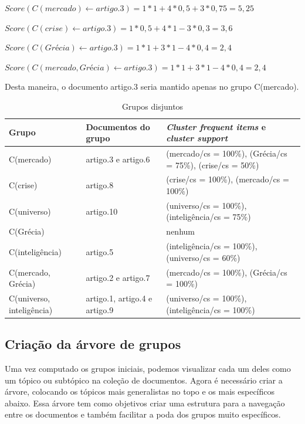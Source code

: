 \documentclass[a4paper,12pt]{article}
\begin{document}
\begin{flushleft}

$Score(C(mercado) \gets artigo.3) = 1 * 1 + 4 * 0,5 + 3 * 0,75 = 5,25$

$Score(C(crise) \gets artigo.3) = 1 * 0,5 + 4 * 1 - 3 * 0,3 = 3,6$

$Score(C(Grécia) \gets artigo.3) = 1 * 1 + 3 * 1 - 4 * 0,4 = 2,4$

$Score(C(mercado, Grécia) \gets artigo.3) = 1 * 1 + 3 * 1 - 4 * 0,4 = 2,4$

\end{flushleft}

Desta maneira, o documento artigo.3 seria mantido apenas no grupo C(mercado).

\begin{table}[h]
\centering
\begin{tabular}{ | l | p{4cm} | p{4.5cm} | }
\hline
Grupo & Documentos do grupo & \textit{Cluster frequent items} e \textit{cluster support} \\ \hline
C(mercado)			& artigo.3 e artigo.6 & (mercado/cs = 100\%), (Grécia/cs = 75\%), (crise/cs = 50\%) \\ \hline
C(crise)                         	& artigo.8 & (crise/cs = 100\%), (mercado/cs = 100\%)  \\ \hline
C(universo)			& artigo.10 & (universo/cs = 100\%), (inteligência/cs = 75\%)  \\ \hline
C(Grécia)			& & nenhum  \\ \hline
C(inteligência)		& artigo.5 & (inteligência/cs = 100\%), (universo/cs = 60\%)  \\ \hline
C(mercado, Grécia)		& artigo.2 e artigo.7 & (mercado/cs = 100\%), (Grécia/cs = 100\%)  \\ \hline
C(universo, inteligência)	& artigo.1, artigo.4 e artigo.9 & (universo/cs = 100\%), (inteligência/cs = 100\%)  \\
\hline
\end{tabular}
\caption{Grupos disjuntos}
\label{table:grupos_disjuntos}
\end{table}

\subsection {Criação da árvore de grupos}
\label {sec:criacao_arvore_grupos}

Uma vez computado os grupos iniciais, podemos visualizar cada um deles como um tópico ou subtópico na coleção de documentos. Agora é necessário criar a árvore, colocando os tópicos mais generalistas no topo e os mais específicos abaixo. Essa árvore tem como objetivos criar uma estrutura para a navegação entre os documentos e também facilitar a poda dos grupos muito específicos.
\end{document}
